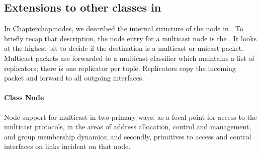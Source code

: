 \subsection{Extensions to other classes in \ns}
In 
\href{the earlier chapter describing nodes in \ns}{Chapter}{chap:nodes},
we described the internal structure of the node in \ns.
To briefly recap that description, the node entry for a multicast node is
the .  It looks at the highest bit to decide
 if the destination is a multicast or unicast packet.
 Multicast packets are forwarded to a multicast
classifier which maintains a list of replicators;
there is one replicator per  tuple.
Replicators copy the incoming packet and forward to all outgoing interfaces.

\paragraph{Class Node}
Node support for multicast in two primary ways:
as a focal point for access to the multicast protocols,
in the areas of address allocation, control and management, and
group membership dynamics;
and secondly, primitives to access and control interfaces on links
incident on that node.
